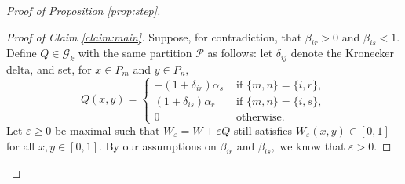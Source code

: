 \documentclass[11pt]{article}
\theoremstyle{definition}
\newcommand{\eps}{\varepsilon}
\begin{document}
\begin{proof}[Proof of Proposition \ref{prop:step}]
    \begin{proof}[Proof of Claim \ref{claim:main}]
        Suppose, for contradiction, that $\beta_{ir} > 0$ and $\beta_{is} < 1$.
        Define  $Q \in \mathcal G_k$ with the same partition $\mathcal{P}$ as follows: let $\delta_{ij}$ denote the Kronecker delta, and set, for $x \in P_m$ and $y \in P_n,$
        \[ Q(x,y) = \begin{cases}
            -(1 + \delta_{ir}) \alpha_s & \text{ if } \{m, n\} = \{i, r\}, \\
            (1 + \delta_{is}) \alpha_r & \text{ if } \{m, n\} = \{i, s\}, \\
            0 & \text{ otherwise.}
        \end{cases} \]
        Let $\eps \ge 0$ be maximal such that $W_{\varepsilon} = W + \eps Q$ still satisfies $W_{\varepsilon} (x,y) \in [0,1]$ for all $x,y \in [0,1]$. By our assumptions on $\beta_{ir}$ and $\beta_{is},$  we know that $\eps>0$.


\end{proof}
\end{proof}
\end{document}

